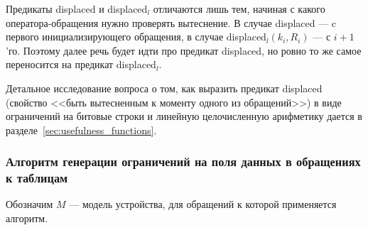 Предикаты displaced и displaced$_l$ отличаются лишь тем, начиная с какого оператора-обращения нужно проверять вытеснение. В случае displaced --- c первого инициализирующего обращения, в случае displaced$_l(k_i, R_i)$ --- с $i+1$'го. Поэтому далее речь будет идти про предикат displaced, но ровно то же самое переносится на предикат displaced$_l$.

Детальное исследование вопроса о том, как выразить предикат displaced (свойство <<быть вытесненным к моменту одного из обращений>>) в виде ограничений на битовые строки и линейную целочисленную арифметику дается в разделе~\ref{sec:usefulness_functions}.

\subsubsection*{Алгоритм генерации ограничений на поля данных в обращениях к таблицам}

Обозначим $M$ --- модель устройства, для обращений к которой применяется алгоритм.

